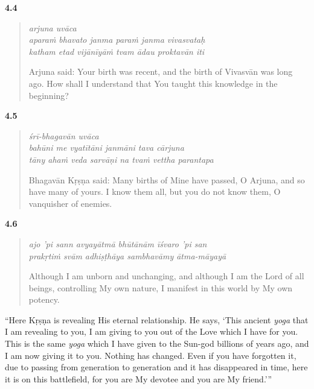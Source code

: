 \par\noindent\textbf{4.4}\par
\begin{verse}
\textit{arjuna uvāca} \\
\textit{aparaṁ bhavato janma paraṁ janma vivasvataḥ} \\
\textit{katham etad vijānīyāṁ tvam ādau proktavān iti}

\noindent Arjuna said: Your birth was recent, and the birth of Vivasvān was long ago. How shall I understand that You taught this knowledge in the beginning?
\end{verse}
\par



\par\noindent\textbf{4.5}\par
\begin{verse}
\textit{śrī-bhagavān uvāca} \\
\textit{bahūni me vyatītāni janmāni tava cārjuna} \\
\textit{tāny ahaṁ veda sarvāṇi na tvaṁ vettha parantapa}

\noindent Bhagavān Kṛṣṇa said: Many births of Mine have passed, O Arjuna, and so have many of yours. I know them all, but you do not know them, O vanquisher of enemies.
\end{verse}
\par



\par\noindent\textbf{4.6}\par
\begin{verse}
\textit{ajo ’pi sann avyayātmā bhūtānām īśvaro ’pi san} \\
\textit{prakṛtiṁ svām adhiṣṭhāya sambhavāmy ātma-māyayā}

\noindent Although I am unborn and unchanging, and although I am the Lord of all beings, controlling My own nature, I manifest in this world by My own potency.
\end{verse}
\par


\enquote{Here Kṛṣṇa is revealing His eternal relationship. He says, \enquote{This ancient \textit{yoga} that I am revealing to you, I am giving to you out of the Love which I have for you. This is the same \textit{yoga} which I have given to the Sun-god billions of years ago, and I am now giving it to you. Nothing has changed. Even if you have forgotten it, due to passing from generation to generation and it has disappeared in time, here it is on this battlefield, for you are My devotee and you are My friend.}}

